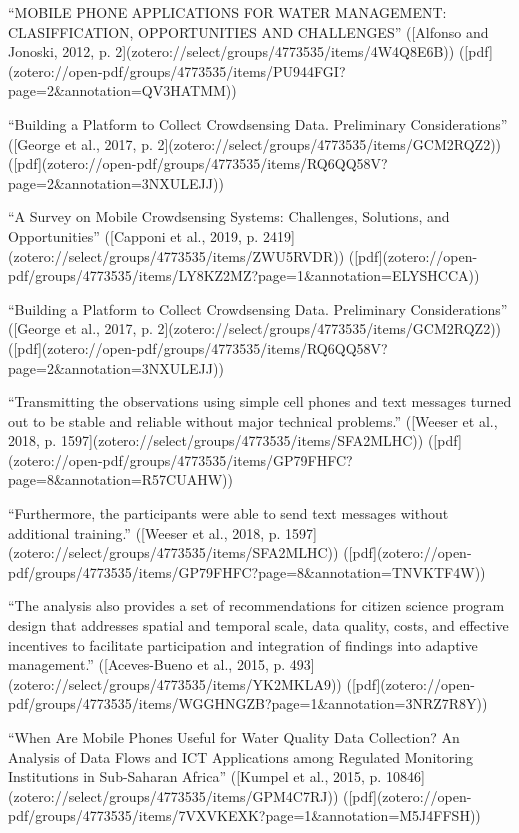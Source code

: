 {“MOBILE PHONE APPLICATIONS FOR WATER MANAGEMENT: CLASIFFICATION, OPPORTUNITIES AND CHALLENGES” ([Alfonso and Jonoski, 2012, p. 2](zotero://select/groups/4773535/items/4W4Q8E6B)) ([pdf](zotero://open-pdf/groups/4773535/items/PU944FGI?page=2&annotation=QV3HATMM))

“Building a Platform to Collect Crowdsensing Data. Preliminary Considerations” ([George et al., 2017, p. 2](zotero://select/groups/4773535/items/GCM2RQZ2)) ([pdf](zotero://open-pdf/groups/4773535/items/RQ6QQ58V?page=2&annotation=3NXULEJJ))

“A Survey on Mobile Crowdsensing Systems: Challenges, Solutions, and Opportunities” ([Capponi et al., 2019, p. 2419](zotero://select/groups/4773535/items/ZWU5RVDR)) ([pdf](zotero://open-pdf/groups/4773535/items/LY8KZ2MZ?page=1&annotation=ELYSHCCA))

“Building a Platform to Collect Crowdsensing Data. Preliminary Considerations” ([George et al., 2017, p. 2](zotero://select/groups/4773535/items/GCM2RQZ2)) ([pdf](zotero://open-pdf/groups/4773535/items/RQ6QQ58V?page=2&annotation=3NXULEJJ))

“Transmitting the observations using simple cell phones and text messages turned out to be stable and reliable without major technical problems.” ([Weeser et al., 2018, p. 1597](zotero://select/groups/4773535/items/SFA2MLHC)) ([pdf](zotero://open-pdf/groups/4773535/items/GP79FHFC?page=8&annotation=R57CUAHW))

“Furthermore, the participants were able to send text messages without additional training.” ([Weeser et al., 2018, p. 1597](zotero://select/groups/4773535/items/SFA2MLHC)) ([pdf](zotero://open-pdf/groups/4773535/items/GP79FHFC?page=8&annotation=TNVKTF4W))

“The analysis also provides a set of recommendations for citizen science program design that addresses spatial and temporal scale, data quality, costs, and effective incentives to facilitate participation and integration of findings into adaptive management.” ([Aceves-Bueno et al., 2015, p. 493](zotero://select/groups/4773535/items/YK2MKLA9)) ([pdf](zotero://open-pdf/groups/4773535/items/WGGHNGZB?page=1&annotation=3NRZ7R8Y))

“When Are Mobile Phones Useful for Water Quality Data Collection? An Analysis of Data Flows and ICT Applications among Regulated Monitoring Institutions in Sub-Saharan Africa” ([Kumpel et al., 2015, p. 10846](zotero://select/groups/4773535/items/GPM4C7RJ)) ([pdf](zotero://open-pdf/groups/4773535/items/7VXVKEXK?page=1&annotation=M5J4FFSH))

}

